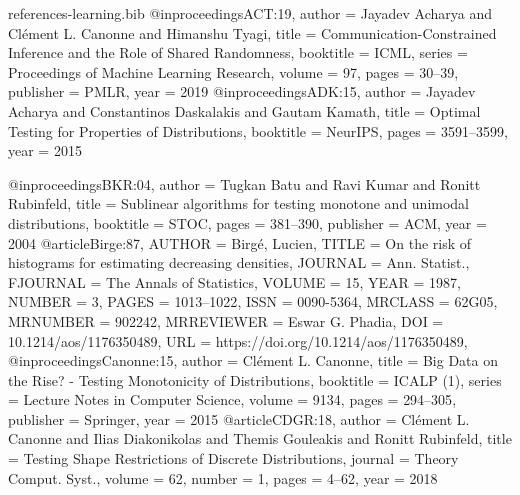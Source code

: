 \documentclass[11pt]{article}
\begin{document}
\begin{filecontents}{references-learning.bib}
@inproceedings{ACT:19,
  author    = {Jayadev Acharya and
               Cl{\'{e}}ment L. Canonne and
               Himanshu Tyagi},
  title     = {Communication-Constrained Inference and the Role of Shared Randomness},
  booktitle = {{ICML}},
  series    = {Proceedings of Machine Learning Research},
  volume    = {97},
  pages     = {30--39},
  publisher = {{PMLR}},
  year      = {2019}
}
@inproceedings{ADK:15,
  author    = {Jayadev Acharya and
               Constantinos Daskalakis and
               Gautam Kamath},
  title     = {Optimal Testing for Properties of Distributions},
  booktitle = {{NeurIPS}},
  pages     = {3591--3599},
  year      = {2015}
}

@inproceedings{BKR:04,
  author    = {Tugkan Batu and
               Ravi Kumar and
               Ronitt Rubinfeld},
  title     = {Sublinear algorithms for testing monotone and unimodal distributions},
  booktitle = {{STOC}},
  pages     = {381--390},
  publisher = {{ACM}},
  year      = {2004}
}
@article{Birge:87,
    AUTHOR = {Birg\'{e}, Lucien},
     TITLE = {On the risk of histograms for estimating decreasing densities},
   JOURNAL = {Ann. Statist.},
  FJOURNAL = {The Annals of Statistics},
    VOLUME = {15},
      YEAR = {1987},
    NUMBER = {3},
     PAGES = {1013--1022},
      ISSN = {0090-5364},
   MRCLASS = {62G05},
  MRNUMBER = {902242},
MRREVIEWER = {Eswar G. Phadia},
       DOI = {10.1214/aos/1176350489},
       URL = {https://doi.org/10.1214/aos/1176350489},
}
@inproceedings{Canonne:15,
  author    = {Cl{\'{e}}ment L. Canonne},
  title     = {Big Data on the Rise? - Testing Monotonicity of Distributions},
  booktitle = {{ICALP} {(1)}},
  series    = {Lecture Notes in Computer Science},
  volume    = {9134},
  pages     = {294--305},
  publisher = {Springer},
  year      = {2015}
}
@article{CDGR:18,
  author    = {Cl{\'{e}}ment L. Canonne and
               Ilias Diakonikolas and
               Themis Gouleakis and
               Ronitt Rubinfeld},
  title     = {Testing Shape Restrictions of Discrete Distributions},
  journal   = {Theory Comput. Syst.},
  volume    = {62},
  number    = {1},
  pages     = {4--62},
  year      = {2018}
}


\end{filecontents}
\end{document}
